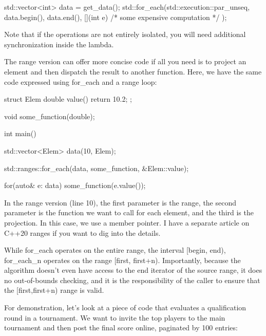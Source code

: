 \begin{box-note}
\begin{cppcode}
std::vector<int> data = get_data();
std::for_each(std::execution::par_unseq, 
    data.begin(), data.end(),
    [](int e) { /* some expensive computation */ });
\end{cppcode}
\end{box-note}

Note that if the operations are not entirely isolated, you will need additional synchronization inside the lambda.

The range version can offer more concise code if all you need is to project an element and then dispatch the result to another function. Here, we have the same code expressed using for\_each and a range loop:

\begin{box-note}
\begin{cppcode}
struct Elem {
    double value() { return 10.2; }
};

void some_function(double);

int main() {
    std::vector<Elem> data(10, Elem{});
    
    std::ranges::for_each(data, some_function, &Elem::value);

    for(auto& e: data) {
        some_function(e.value());
    }
}
\end{cppcode}
\end{box-note}

In the range version (line 10), the first parameter is the range, the second parameter is the function we want to call for each element, and the third is the projection. In this case, we use a member pointer. I have a separate article on C++20 ranges if you want to dig into the details.


While for\_each operates on the entire range, the interval [begin, end), for\_each\_n operates on the range [first, first+n). Importantly, because the algorithm doesn’t even have access to the end iterator of the source range, it does no out-of-bounds checking, and it is the responsibility of the caller to ensure that the [first,first+n) range is valid.

For demonstration, let’s look at a piece of code that evaluates a qualification round in a tournament. We want to invite the top players to the main tournament and then post the final score online, paginated by 100 entries:

